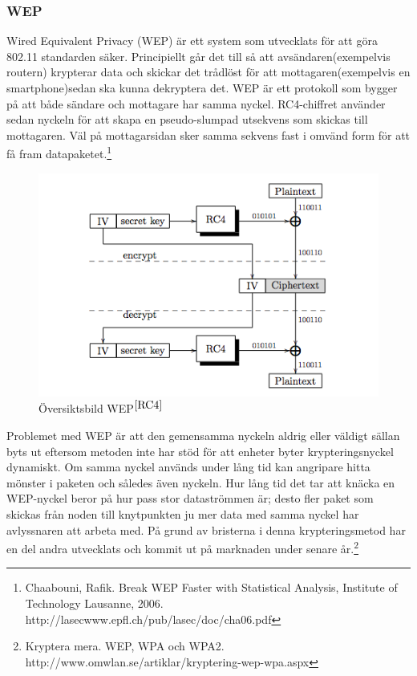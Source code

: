 \documentclass[a4paper,12pt,fleqn]{article}
\begin{document}
\subsubsection{WEP}
Wired Equivalent Privacy (WEP) är ett system som utvecklats för att göra 802.11 standarden säker. Principiellt går det till så att avsändaren(exempelvis routern) krypterar data och skickar det trådlöst för att mottagaren(exempelvis en smartphone)sedan ska kunna dekryptera det. WEP är ett protokoll som bygger på att både sändare och mottagare har samma nyckel. RC4-chiffret använder sedan nyckeln för att skapa en pseudo-slumpad utsekvens som skickas till mottagaren. Väl på mottagarsidan sker samma sekvens fast i omvänd form för att få fram datapaketet.\footnote{\label{RC4}Chaabouni, Rafik. Break WEP Faster with Statistical Analysis, Institute of Technology Lausanne, 2006. http://lasecwww.epfl.ch/pub/lasec/doc/cha06.pdf}

\begin{figure}[htp]
  \begin{center}
  \includegraphics[keepaspectratio=true,width=0.5\linewidth]{WEP}  %
  \caption{Översiktsbild WEP$^{\ref{RC4}}$} %
  \end{center}
  \label{fig:overview}
\end{figure}
\newpage
Problemet med WEP är att den gemensamma nyckeln aldrig eller väldigt sällan byts ut eftersom metoden inte har stöd för att enheter byter krypteringsnyckel dynamiskt. Om samma nyckel används under lång tid kan angripare hitta mönster i paketen och således även nyckeln. Hur lång tid det tar att knäcka en WEP-nyckel beror på hur pass stor dataströmmen är; desto fler paket som skickas från noden till knytpunkten ju mer data med samma nyckel har avlyssnaren att arbeta med. På grund av bristerna i denna krypteringsmetod har en del andra utvecklats och kommit ut på marknaden under senare år.\footnote{\label{WEP}Kryptera mera. WEP, WPA och WPA2. http://www.omwlan.se/artiklar/kryptering-wep-wpa.aspx }
\end{document}

